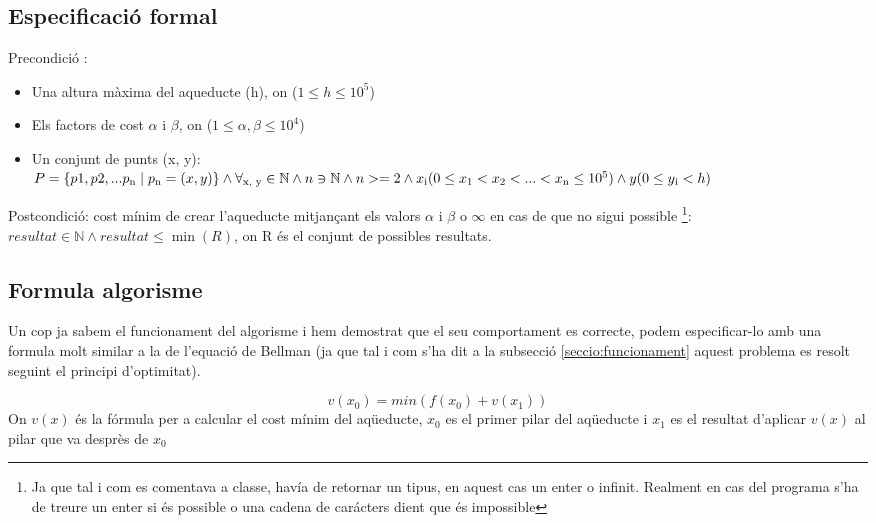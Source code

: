 \documentclass[12pt, letterpaper]{article}
\begin{document}
\subsection{Especificació formal}
Precondició :
\begin{itemize}
    \item Una altura màxima del aqueducte (h), on ($1 \leq h \leq 10^5$)
    \item Els factors de cost $\alpha$ i $\beta$, on ($1\leq \alpha, \beta \leq 10^4$)
    \item Un conjunt de punts (x, y):\\
        $P = \{p1, p2, ... p\textsubscript{n} \mid p\textsubscript{n} = (x, y) \} \land \forall \textsubscript{x, y} \in \mathbb{N} \land n \owns \mathbb{N} \land n >= 2 
        \land x\textsubscript{i} (0\leq x\textsubscript{1} < x\textsubscript{2} < ... < x\textsubscript{n} \leq 10^5) \land y (0 \leq y\textsubscript{i} < h) $

\end{itemize}
Postcondició: cost mínim de crear l'aqueducte mitjançant els valors $\alpha$ i $\beta$ o $\infty$ en cas de que no sigui possible \footnote{Ja que tal i com es comentava a classe, havía de retornar un tipus, en aquest cas un enter o infinit. Realment en cas del programa s'ha de treure un enter si és possible o una cadena de carácters dient que és impossible}:\\

        $ resultat \in \mathbb{N} \land resultat \leq \min(R) $, on R és el conjunt de possibles resultats.


\subsection{Formula algorisme}
Un cop ja sabem el funcionament del algorisme i hem demostrat que el seu comportament es correcte, podem especificar-lo amb una formula molt similar a la de l'equació de Bellman (ja que tal i com s'ha dit a la subsecció \ref{seccio:funcionament} aquest problema es resolt seguint el principi d'optimitat).

\begin{center}
\begin{equation}
v(x_{0}) = min(f(x_{0}) + v(x_{1}))
\end{equation}
On $v(x)$ és la fórmula per a calcular el cost mínim del aqüeducte, $x_{0}$ es el primer pilar del aqüeducte i $x_{1}$ es el resultat d'aplicar $v(x)$ al pilar que va desprès de $x_{0}$
\end{center}
\end{document}
